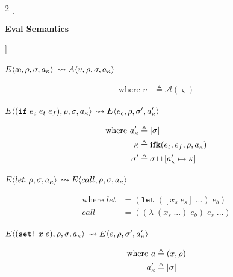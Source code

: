 \documentclass[12pt,draft]{article}
\newcommand\mae{\ensuremath{\text{\ae}}}
\newcommand{\ifsyn}[3]{(\texttt{if}\;#1\;#2\;#3)}
\newcommand{\setsyn}[2]{(\texttt{set!}\;#1\;#2)}
\newcommand{\E}[4]{E\langle #1 , #2 , #3 , #4 \rangle}
\newcommand{\A}[4]{A\langle #1 , #2 , #3 , #4 \rangle}
\begin{document}
\begin{multicols*}{2}
  [
  \begin{center}
    \textbf{Eval Semantics}
  \end{center}
  ]
  \begin{center}
    $\E{\mae}{\cenv}{\cstore}{\ckaddr}$
    $\leadsto \A{v}{\cenv}{\cstore}{\ckaddr}$
  \end{center}
  \vspace{-7mm}
  \begin{align*}
    \text{where } v &\triangleq \mathcal{A}(\varsigma)
  \end{align*}
  \begin{center}
    $\E{\ifsyn{e_c}{e_t}{e_f}}{\cenv}{\cstore}{\ckaddr}$
    $\leadsto \E{e_c}{\cenv}{\cstore'}{\ckaddr'}$
  \end{center}
  \vspace{-7mm}
  \begin{align*}
    \text{where }
    a_{\kappa}' &\triangleq |\sigma| \\
    \kappa &\triangleq \textbf{ifk}(e_t , e_f , \rho , a_{\kappa}) \\
    \sigma' &\triangleq \sigma \sqcup [a_{\kappa}' \mapsto \kappa]
  \end{align*}
  \begin{center}
    $\E{let}{\cenv}{\cstore}{\ckaddr}$
    $\leadsto \E{call}{\cenv}{\cstore}{\ckaddr}$
  \end{center}
  \vspace{-7mm}
  \begin{align*}
    \text{where }
    let &= (\texttt{let} \; ([x_s \; e_s] \; ...) \; e_b) \\
    call &= ((\lambda \; (x_s \; ...) \; e_b) \; e_s \; ...)
  \end{align*}
  \begin{center}
    $\E{\setsyn{x}{e}}{\cenv}{\cstore}{\ckaddr}$
    $\leadsto \E{e}{\cenv}{\cstore'}{\ckaddr'}$
  \end{center}
  \vspace{-7mm}
  \begin{align*}
    \text{where }
    a &\triangleq (x , \cenv) \\
    \ckaddr' &\triangleq |\cstore| \\

\end{align*}
\end{multicols*}
\end{document}
